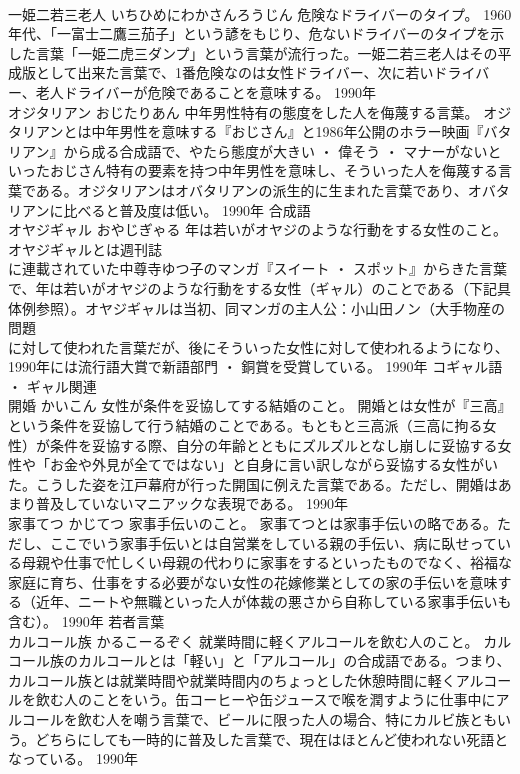 \documentclass[8pt]{extreport}
\begin{document}
\begin{CJK}{UTF8}{min}
\\	一姫二若三老人	いちひめにわかさんろうじん	危険なドライバーのタイプ。	1960年代、「一富士二鷹三茄子」という諺をもじり、危ないドライバーのタイプを示した言葉「一姫二虎三ダンプ」という言葉が流行った。一姫二若三老人はその平成版として出来た言葉で、1番危険なのは女性ドライバー、次に若いドライバー、老人ドライバーが危険であることを意味する。	1990年	
\\	オジタリアン	おじたりあん	中年男性特有の態度をした人を侮蔑する言葉。	オジタリアンとは中年男性を意味する『おじさん』と1986年公開のホラー映画『バタリアン』から成る合成語で、やたら態度が大きい ・ 偉そう ・ マナーがないといったおじさん特有の要素を持つ中年男性を意味し、そういった人を侮蔑する言葉である。オジタリアンはオバタリアンの派生的に生まれた言葉であり、オバタリアンに比べると普及度は低い。	1990年	合成語	
\\	オヤジギャル	おやじぎゃる	年は若いがオヤジのような行動をする女性のこと。	オヤジギャルとは週刊誌
\\	に連載されていた中尊寺ゆつ子のマンガ『スイート ・ スポット』からきた言葉で、年は若いがオヤジのような行動をする女性（ギャル）のことである（下記具体例参照）。オヤジギャルは当初、同マンガの主人公：小山田ノン（大手物産の問題
\\	に対して使われた言葉だが、後にそういった女性に対して使われるようになり、1990年には流行語大賞で新語部門 ・ 銅賞を受賞している。	1990年	コギャル語 ・ ギャル関連	
\\	開婚	かいこん	女性が条件を妥協してする結婚のこと。	開婚とは女性が『三高』という条件を妥協して行う結婚のことである。もともと三高派（三高に拘る女性）が条件を妥協する際、自分の年齢とともにズルズルとなし崩しに妥協する女性や「お金や外見が全てではない」と自身に言い訳しながら妥協する女性がいた。こうした姿を江戸幕府が行った開国に例えた言葉である。ただし、開婚はあまり普及していないマニアックな表現である。	1990年	
\\	家事てつ	かじてつ	家事手伝いのこと。	家事てつとは家事手伝いの略である。ただし、ここでいう家事手伝いとは自営業をしている親の手伝い、病に臥せっている母親や仕事で忙しくい母親の代わりに家事をするといったものでなく、裕福な家庭に育ち、仕事をする必要がない女性の花嫁修業としての家の手伝いを意味する（近年、ニートや無職といった人が体裁の悪さから自称している家事手伝いも含む）。	1990年	若者言葉	
\\	カルコール族	かるこーるぞく	就業時間に軽くアルコールを飲む人のこと。	カルコール族のカルコールとは「軽い」と「アルコール」の合成語である。つまり、カルコール族とは就業時間や就業時間内のちょっとした休憩時間に軽くアルコールを飲む人のことをいう。缶コーヒーや缶ジュースで喉を潤すように仕事中にアルコールを飲む人を嘲う言葉で、ビールに限った人の場合、特にカルビ族ともいう。どちらにしても一時的に普及した言葉で、現在はほとんど使われない死語となっている。	1990年	

\end{CJK}
\end{document}

